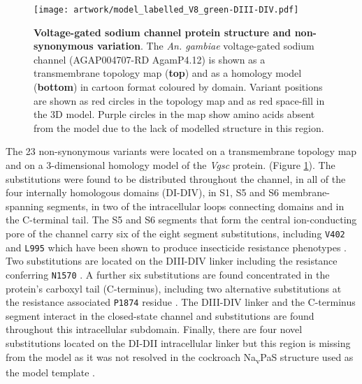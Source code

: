 \documentclass[a4paper,11pt,abstracton,hidelinks]{scrartcl}
\begin{document}
%
\begin{figure}[!t]

  \centering

  \texttt{[image: artwork/model\_labelled\_V8\_green-DIII-DIV.pdf]}

  \caption{\textbf{Voltage-gated sodium channel protein structure and non-synonymous variation}. The \textit{An. gambiae} voltage-gated sodium channel (AGAP004707-RD AgamP4.12) is shown as a transmembrane topology map (\textbf{top}) and as a homology model (\textbf{bottom}) in cartoon format coloured by domain. Variant positions are shown as red circles in the topology map and as red space-fill in the 3D model. Purple circles in the map show amino acids absent from the model due to the lack of modelled structure in this region.}

  \label{fig:protein}

\end{figure}


The 23 non-synonymous variants were located on a transmembrane topology map and on a 3-dimensional homology model of the \textit{Vgsc} protein. (Figure \ref{fig:protein}).
The substitutions were found to be distributed throughout the channel, in all of the four internally homologous domains (DI-DIV), in S1, S5 and S6 membrane-spanning segments, in two of the intracellular loops connecting domains and in the C-terminal tail.
%
The S5 and S6 segments that form the central ion-conducting pore of the channel carry six of the eight segment substitutions, including \texttt{V402} and \texttt{L995} which have been shown to produce insecticide resistance phenotypes \cite{Davies2007a, Dong2014, Martinez-Torres1998,Silva2014, Ranson2000}.
%
Two substitutions are located on the DIII-DIV linker including the resistance conferring \texttt{N1570} \cite{Jones2012}. 
%
A further six substitutions are found concentrated in the protein's carboxyl tail (C-terminus), including two alternative substitutions at the resistance associated \texttt{P1874} residue \cite{Sonoda2008}. 
%
The DIII-DIV linker and the C-terminus segment interact in the closed-state channel and substitutions are found throughout this intracellular subdomain.  
%
Finally, there are four novel substitutions located on the DI-DII intracellular linker but this region is missing from the model as it was not resolved in the cockroach Na\textsubscript{v}PaS structure used as the model template \cite{Shen2017}. 
\end{document}
